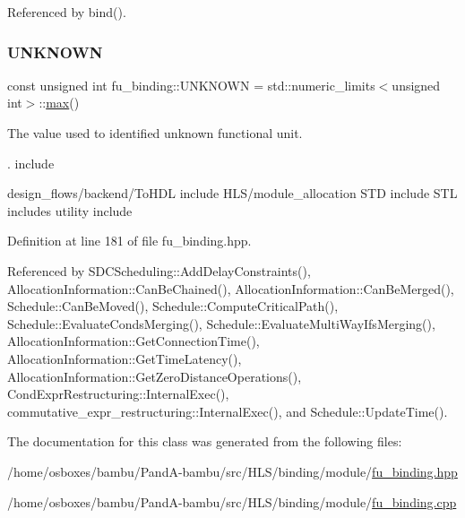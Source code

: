Referenced by bind().

\mbox{\label{classfu__binding_acf9c4a06a84cfd86f7e6b8259f5a1315}} 
\subsubsection{\texorpdfstring{U\+N\+K\+N\+O\+WN}{UNKNOWN}}
{\footnotesize\ttfamily const unsigned int fu\+\_\+binding\+::\+U\+N\+K\+N\+O\+WN = std\+::numeric\+\_\+limits$<$unsigned int$>$\+::\hyperlink{tutorial__pact__2019_2Target-Customization_2first_2hint_8c_a28f422940797ea297699ba55d89171c5}{max}()\hspace{0.3cm}{\ttfamily [static]}}



The value used to identified unknown functional unit. 

. include

design\+\_\+flows/backend/\+To\+H\+DL include H\+L\+S/module\+\_\+allocation S\+TD include S\+TL includes utility include 

Definition at line 181 of file fu\+\_\+binding.\+hpp.



Referenced by S\+D\+C\+Scheduling\+::\+Add\+Delay\+Constraints(), Allocation\+Information\+::\+Can\+Be\+Chained(), Allocation\+Information\+::\+Can\+Be\+Merged(), Schedule\+::\+Can\+Be\+Moved(), Schedule\+::\+Compute\+Critical\+Path(), Schedule\+::\+Evaluate\+Conds\+Merging(), Schedule\+::\+Evaluate\+Multi\+Way\+Ifs\+Merging(), Allocation\+Information\+::\+Get\+Connection\+Time(), Allocation\+Information\+::\+Get\+Time\+Latency(), Allocation\+Information\+::\+Get\+Zero\+Distance\+Operations(), Cond\+Expr\+Restructuring\+::\+Internal\+Exec(), commutative\+\_\+expr\+\_\+restructuring\+::\+Internal\+Exec(), and Schedule\+::\+Update\+Time().



The documentation for this class was generated from the following files\+:\begin{DoxyCompactItemize}
\item 
/home/osboxes/bambu/\+Pand\+A-\/bambu/src/\+H\+L\+S/binding/module/\hyperlink{fu__binding_8hpp}{fu\+\_\+binding.\+hpp}\item 
/home/osboxes/bambu/\+Pand\+A-\/bambu/src/\+H\+L\+S/binding/module/\hyperlink{fu__binding_8cpp}{fu\+\_\+binding.\+cpp}\end{DoxyCompactItemize}
